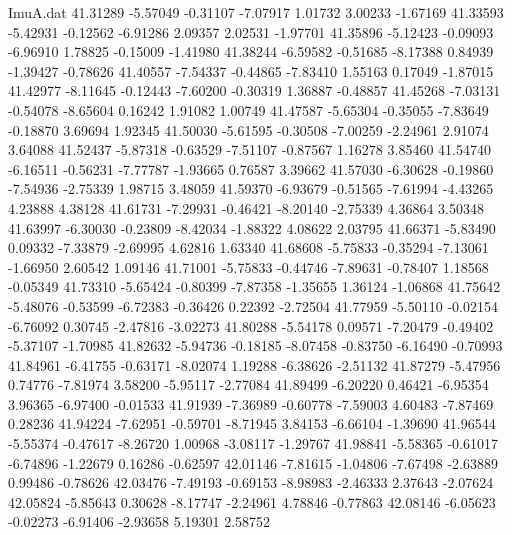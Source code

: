 \begin{filecontents}{ImuA.dat}
  41.31289   -5.57049   -0.31107   -7.07917    1.01732    3.00233   -1.67169
  41.33593   -5.42931   -0.12562   -6.91286    2.09357    2.02531   -1.97701
  41.35896   -5.12423   -0.09093   -6.96910    1.78825   -0.15009   -1.41980
  41.38244   -6.59582   -0.51685   -8.17388    0.84939   -1.39427   -0.78626
  41.40557   -7.54337   -0.44865   -7.83410    1.55163    0.17049   -1.87015
  41.42977   -8.11645   -0.12443   -7.60200   -0.30319    1.36887   -0.48857
  41.45268   -7.03131   -0.54078   -8.65604    0.16242    1.91082    1.00749
  41.47587   -5.65304   -0.35055   -7.83649   -0.18870    3.69694    1.92345
  41.50030   -5.61595   -0.30508   -7.00259   -2.24961    2.91074    3.64088
  41.52437   -5.87318   -0.63529   -7.51107   -0.87567    1.16278    3.85460
  41.54740   -6.16511   -0.56231   -7.77787   -1.93665    0.76587    3.39662
  41.57030   -6.30628   -0.19860   -7.54936   -2.75339    1.98715    3.48059
  41.59370   -6.93679   -0.51565   -7.61994   -4.43265    4.23888    4.38128
  41.61731   -7.29931   -0.46421   -8.20140   -2.75339    4.36864    3.50348
  41.63997   -6.30030   -0.23809   -8.42034   -1.88322    4.08622    2.03795
  41.66371   -5.83490    0.09332   -7.33879   -2.69995    4.62816    1.63340
  41.68608   -5.75833   -0.35294   -7.13061   -1.66950    2.60542    1.09146
  41.71001   -5.75833   -0.44746   -7.89631   -0.78407    1.18568   -0.05349
  41.73310   -5.65424   -0.80399   -7.87358   -1.35655    1.36124   -1.06868
  41.75642   -5.48076   -0.53599   -6.72383   -0.36426    0.22392   -2.72504
  41.77959   -5.50110   -0.02154   -6.76092    0.30745   -2.47816   -3.02273
  41.80288   -5.54178    0.09571   -7.20479   -0.49402   -5.37107   -1.70985
  41.82632   -5.94736   -0.18185   -8.07458   -0.83750   -6.16490   -0.70993
  41.84961   -6.41755   -0.63171   -8.02074    1.19288   -6.38626   -2.51132
  41.87279   -5.47956    0.74776   -7.81974    3.58200   -5.95117   -2.77084
  41.89499   -6.20220    0.46421   -6.95354    3.96365   -6.97400   -0.01533
  41.91939   -7.36989   -0.60778   -7.59003    4.60483   -7.87469    0.28236
  41.94224   -7.62951   -0.59701   -8.71945    3.84153   -6.66104   -1.39690
  41.96544   -5.55374   -0.47617   -8.26720    1.00968   -3.08117   -1.29767
  41.98841   -5.58365   -0.61017   -6.74896   -1.22679    0.16286   -0.62597
  42.01146   -7.81615   -1.04806   -7.67498   -2.63889    0.99486   -0.78626
  42.03476   -7.49193   -0.69153   -8.98983   -2.46333    2.37643   -2.07624
  42.05824   -5.85643    0.30628   -8.17747   -2.24961    4.78846   -0.77863
  42.08146   -6.05623   -0.02273   -6.91406   -2.93658    5.19301    2.58752

\end{filecontents}
